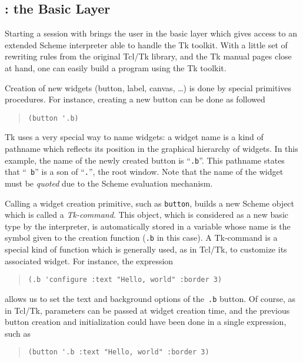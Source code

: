 {\subsection{\stk: the Basic Layer}

Starting a session with {\stk} brings the user in the
basic layer which gives access to an extended Scheme interpreter
able to handle the Tk toolkit. With a little set of rewriting
rules from the original Tcl/Tk library, and the Tk manual pages close
at hand, one can easily build a {\stk} program using the Tk toolkit.

Creation of new widgets (button, label, canvas, \ldots) is done by
special {\stk} primitives procedures. For instance, creating a new
button can be done as followed
\begin{quote}\figsize
\begin{verbatim}
(button '.b)
\end{verbatim}
\end{quote}
Tk uses a very special way to name widgets: a widget name is a kind
of pathname which reflects its position in
the graphical hierarchy of widgets. In this example, the name of the
newly created button is ``{\tt .b}''. This pathname states that ``{\tt
b}'' is a son of ``{\tt .}'', the root window. Note that the name of
the widget must be {\em quoted} due to the Scheme evaluation
mechanism. 

Calling a widget creation primitive, such as {\tt button},
builds a new Scheme object which is called a {\em Tk-command}. This
object, which is considered as a new basic type by the {\stk}
interpreter, is automatically stored in a variable whose name is the
symbol given to the creation function ({\tt .b} in this case).  A
Tk-command is a special kind of function which is generally used, as
in Tcl/Tk, to customize its associated widget. For instance, the
expression\label{configure}
\begin{quote}\figsize
\begin{verbatim}
(.b 'configure :text "Hello, world" :border 3)
\end{verbatim}
\end{quote}
\noindent
allows us to set the text and background options of
the~{\tt .b} button. Of course, as in Tcl/Tk, parameters can be passed
at widget creation time, and the previous button creation and
initialization could have been done in a single expression, such as
\begin{quote}\figsize
\begin{verbatim}
(button '.b :text "Hello, world" :border 3)
\end{verbatim}
\end{quote}
\noindent

}
